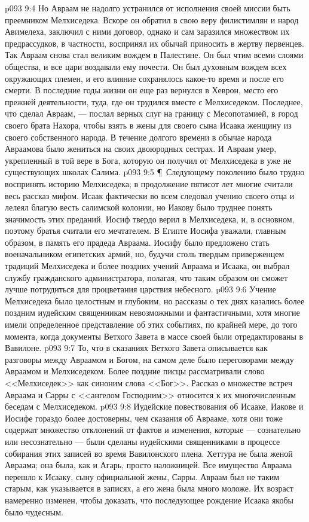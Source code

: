 \vs p093 9:4 Но Авраам не надолго устранился от исполнения своей миссии быть преемником Мелхиседека. Вскоре он обратил в свою веру филистимлян и народ Авимелеха, заключил с ними договор, однако и сам заразился множеством их предрассудков, в частности, воспринял их обычай приносить в жертву первенцев. Так Авраам снова стал великим вождем в Палестине. Он был чтим всеми слоями общества, и все цари воздавали ему почести. Он был духовным вождем всех окружающих племен, и его влияние сохранялось какое\hyp{}то время и после его смерти. В последние годы жизни он еще раз вернулся в Хеврон, место его прежней деятельности, туда, где он трудился вместе с Мелхиседеком. Последнее, что сделал Авраам, --- послал верных слуг на границу с Месопотамией, в город своего брата Нахора, чтобы взять в жены для своего сына Исаака женщину из своего собственного народа. В течение долгого времени в обычае народа Авраамова было жениться на своих двоюродных сестрах. И Авраам умер, укрепленный в той вере в Бога, которую он получил от Мелхиседека в уже не существующих школах Салима.
\vs p093 9:5 \P\ Следующему поколению было трудно воспринять историю Мелхиседека; в продолжение пятисот лет многие считали весь рассказ мифом. Исаак фактически во всем следовал учению своего отца и лелеял благую весть салимской колонии, но Иакову было труднее понять значимость этих преданий. Иосиф твердо верил в Мелхиседека, и, в основном, поэтому братья считали его мечтателем. В Египте Иосифа уважали, главным образом, в память его прадеда Авраама. Иосифу было предложено стать военачальником египетских армий, но, будучи столь твердым приверженцем традиций Мелхиседека и более поздних учений Авраама и Исаака, он выбрал службу гражданского администратора, полагая, что таким образом он сможет лучше потрудиться для процветания царствия небесного.
\vs p093 9:6 Учение Мелхиседека было целостным и глубоким, но рассказы о тех днях казались более поздним иудейским священникам невозможными и фантастичными, хотя многие имели определенное представление об этих событиях, по крайней мере, до того момента, когда документы Ветхого Завета в массе своей были отредактированы в Вавилоне.
\vs p093 9:7 То, что в сказаниях Ветхого Завета описывается как разговоры между Авраамом и Богом, на самом деле было переговорами между Авраамом и Мелхиседеком. Более поздние писцы рассматривали слово <<Мелхиседек>> как синоним слова <<Бог>>. Рассказ о множестве встреч Авраама и Сарры с <<ангелом Господним>> относится к их многочисленным беседам с Мелхиседеком.
\vs p093 9:8 Иудейские повествования об Исааке, Иакове и Иосифе гораздо более достоверны, чем сказания об Аврааме, хотя они тоже содержат множество отклонений от фактов и изменения, которые --- сознательно или несознательно --- были сделаны иудейскими священниками в процессе собирания этих записей во время Вавилонского плена. Хеттура не была женой Авраама; она была, как и Агарь, просто наложницей. Все имущество Авраама перешло к Исааку, сыну официальной жены, Сарры. Авраам был не таким старым, как указывается в записях, а его жена была много моложе. Их возраст намеренно изменен, чтобы доказать, что последующее рождение Исаака якобы было чудесным.
